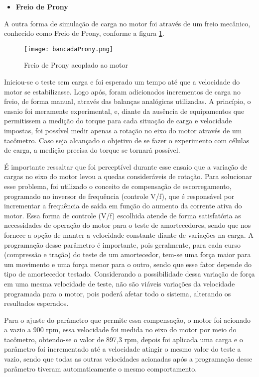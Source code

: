 		\begin{itemize}
		\item \textbf{Freio de Prony}
		\end{itemize}

			A outra forma de simulação de carga no motor foi através de um freio mecânico, conhecido como Freio de Prony, conforme a figura \ref{bancadaProny}.

			\begin{figure}[!hptb]
				\centering
				\texttt{[image: bancadaProny.png]}
				\caption[Freio de Prony acoplado ao motor]{Freio de Prony acoplado ao motor} 
				\label{bancadaProny}
			\end{figure}

			Iniciou-se o teste sem carga e foi esperado um tempo até que a velocidade do motor se estabilizasse. Logo após, foram adicionados incrementos de carga no freio, de forma manual, através das balanças analógicas utilizadas. A princípio, o ensaio foi meramente experimental, e, diante da ausência de equipamentos que permitissem a medição do torque para cada situação de carga e velocidade impostas, foi possível medir apenas a rotação no eixo do motor através de um tacômetro. Caso seja alcançado o objetivo de se fazer o experimento com células de carga, a medição precisa do torque se tornará possível.

			É importante ressaltar que foi perceptível durante esse ensaio que a variação de cargas no eixo do motor levou a quedas consideráveis de rotação. Para solucionar esse problema, foi utilizado o conceito de compensação de escorregamento, programado no inversor de frequência (controle V/f), que é responsável por incrementar a frequência de saída em função do aumento da corrente ativa do motor. Essa forma de controle (V/f) escolhida atende de forma satisfatória as necessidades de operação do motor para o teste de amortecedores, sendo que nos fornece a opção de manter a velocidade constante diante de variações na carga.  A programação desse parâmetro é importante, pois geralmente, para cada curso (compressão e tração) do teste de um amortecedor, tem-se uma força maior para um movimento e uma força menor para o outro, sendo que esse fator depende do tipo de amortecedor testado. Considerando a possibilidade dessa variação de força em uma mesma velocidade de teste, não são viáveis variações da velocidade programada para o motor, pois poderá afetar todo o sistema, alterando os resultados esperados.
			
			Para o ajuste do parâmetro que permite essa compensação, o motor foi acionado a vazio a 900 rpm, essa velocidade foi medida no eixo do motor por meio do tacômetro, obtendo-se o valor de 897,3 rpm, depois foi aplicada uma carga e o parâmetro foi incrementado até a velocidade atingir o mesmo valor do teste a vazio, sendo que todas as outras velocidades acionadas após a programação desse parâmetro tiveram automaticamente o mesmo comportamento.

